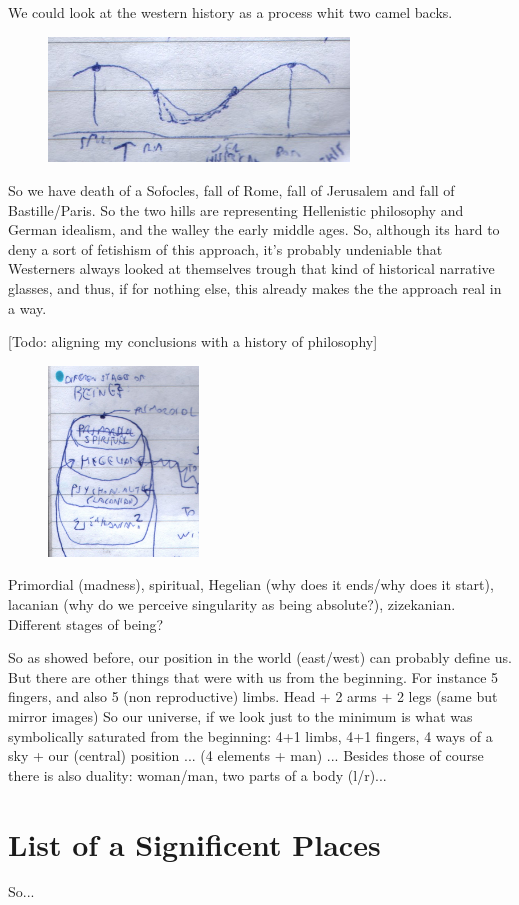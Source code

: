 \documentclass[10pt]{book}
\begin{document}
We could look at the western history as a process whit two camel backs. 
\begin{figure}[ht!]
\centering
\includegraphics[width=80mm]{scan11.jpg}
\label{overflow}
\end{figure}
So we have death of a Sofocles, fall of Rome, fall of Jerusalem and fall of Bastille/Paris. So the two hills are representing Hellenistic philosophy and German idealism, and the walley the early middle ages.
So, although its hard to deny a sort of fetishism of this approach, it's probably undeniable that Westerners always looked at themselves trough that kind of historical narrative glasses, and  thus, if for nothing else, this already makes the the approach real in a way.

[Todo: aligning my conclusions with a history of philosophy]

\begin{figure}[ht!]
\centering
\includegraphics[width=40mm]{scan13.jpg}
\label{overflow}
\end{figure}
Primordial (madness), spiritual, Hegelian (why does it ends/why does it start), lacanian (why do we perceive singularity as being absolute?), zizekanian. 
Different stages of being?

So as showed before, our position in the world (east/west) can probably define us. But there are other things that were with us from the beginning. For instance 5 fingers, and also 5 (non reproductive) limbs. Head + 2 arms + 2 legs (same but mirror images)
So our universe, if we look just to the minimum is what was symbolically saturated from the beginning: 4+1 limbs, 4+1 fingers, 4 ways of a sky + our (central) position ... (4 elements + man) ... Besides those of course there is also duality: woman/man, two parts of a body (l/r)...

\chapter{List of a Significent Places}

So...
\end{document}

